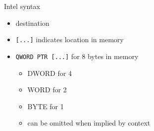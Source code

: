 \begin{frame}{Intel syntax}
    \begin{itemize}
    \item destination 
    \item {\tt [...]} indicates location in memory
    \item {\tt QWORD PTR [...]} for 8 bytes in memory
        \begin{itemize}
        \item DWORD for 4
        \item WORD for 2
        \item BYTE for 1
        \item can be omitted when implied by context
        \end{itemize}
    \end{itemize}
\end{frame}



